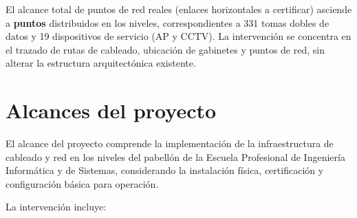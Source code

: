 El alcance total de puntos de red reales (enlaces horizontales a certificar) asciende a \textbf{\totalPuntos{} puntos} distribuidos en los \totalPisos{} niveles, correspondientes a 331 tomas dobles de datos y 19 dispositivos de servicio (AP y CCTV). La intervención se concentra en el trazado de rutas de cableado, ubicación de gabinetes y puntos de red, sin alterar la estructura arquitectónica existente.

\section{Alcances del proyecto}

El alcance del proyecto comprende la implementación de la infraestructura de cableado y red en los \totalPisos{} niveles del pabellón de la Escuela Profesional de Ingeniería Informática y de Sistemas, considerando la instalación física, certificación y configuración básica para operación.

La intervención incluye:

